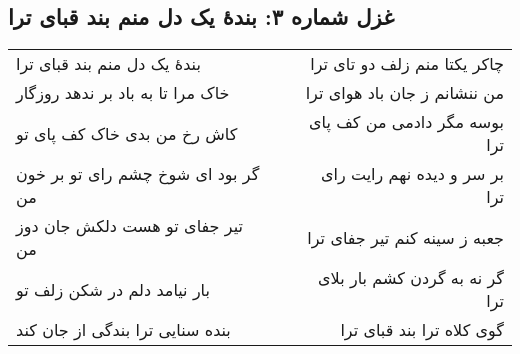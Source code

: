 \begin{center}
\section*{غزل شماره ۳: بندهٔ یک دل منم بند قبای ترا}
\label{sec:003}
\begin{longtable}{l p{0.5cm} r}
بندهٔ یک دل منم بند قبای ترا
&&
چاکر یکتا منم زلف دو تای ترا
\\
خاک مرا تا به باد بر ندهد روزگار
&&
من ننشانم ز جان باد هوای ترا
\\
کاش رخ من بدی خاک کف پای تو
&&
بوسه مگر دادمی من کف پای ترا
\\
گر بود ای شوخ چشم رای تو بر خون من
&&
بر سر و دیده نهم رایت رای ترا
\\
تیر جفای تو هست دلکش جان دوز من
&&
جعبه ز سینه کنم تیر جفای ترا
\\
بار نیامد دلم در شکن زلف تو
&&
گر نه به گردن کشم بار بلای ترا
\\
بنده سنایی ترا بندگی از جان کند
&&
گوی کلاه ترا بند قبای ترا
\\
\end{longtable}
\end{center}

